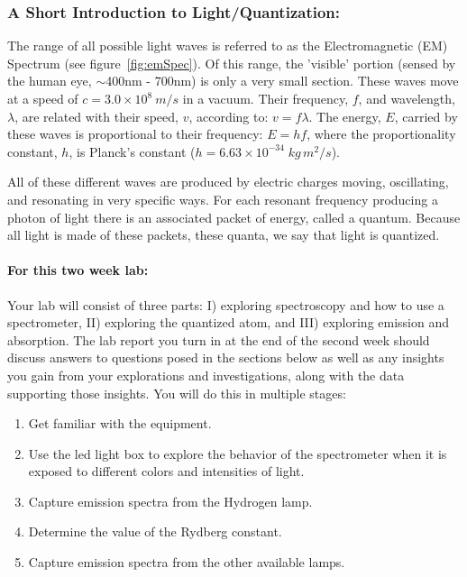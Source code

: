 \subsubsection*{A Short Introduction to Light/Quantization:}
The range of all possible light waves is referred to as the Electromagnetic (EM) Spectrum (see figure~\ref{fig:emSpec}). 
Of this range, the 'visible' portion (sensed by the human eye, $\sim$400nm - 700nm) is only a very small section. 
These waves move at a speed of $c = 3.0 \times 10^{8} \: m/s$ in a vacuum. 
Their frequency, $f$, and wavelength, $\lambda$, are related with their speed, $v$, according to: $v = f \lambda$. 
The energy, $E$, carried by these waves is proportional to their frequency: $E = h f$, where the proportionality constant, $h$, is Planck's constant ($h = 6.63 \times 10^{-34} \; kg \, m^{2}/s$). 
\par
All of these different waves are produced by electric charges moving, oscillating, and resonating in very specific ways. 
For each resonant frequency producing a photon of light there is an associated packet of energy, called a quantum. 
Because all light is made of these packets, these quanta, we say that light is quantized.

\paragraph{For this two week lab:} Your lab will consist of three parts: I) exploring spectroscopy and how to use a spectrometer, II) exploring the quantized atom, and III) exploring emission and absorption.
The lab report you turn in at the end of the second week should discuss answers to questions posed in the sections below as well as any insights you gain from your explorations and investigations, along with the data supporting those insights.
You will do this in multiple stages:
\begin{enumerate}
\itemsep-0.2em
\item Get familiar with the equipment.
\item Use the led light box to explore the behavior of the spectrometer when it is exposed to different colors and intensities of light.
\item Capture emission spectra from the Hydrogen lamp.
\item Determine the value of the Rydberg constant.
\item Capture emission spectra from the other available lamps.
\end{enumerate}

